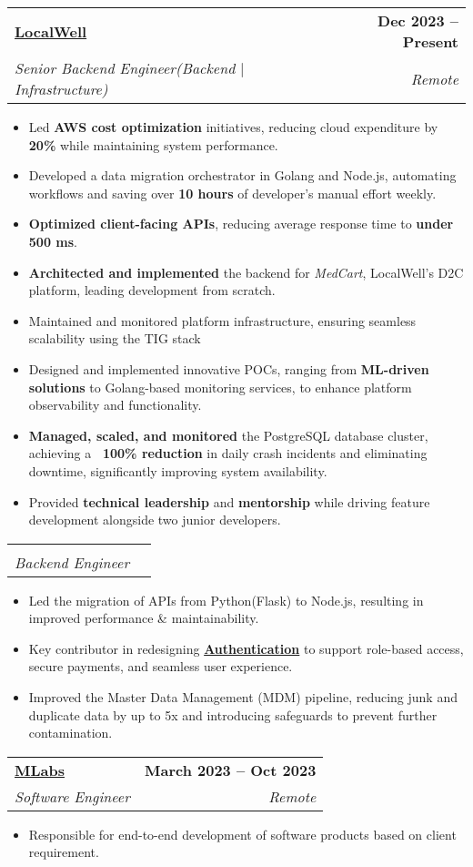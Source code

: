 \documentclass[letterpaper,11pt]{article}
\makeatletter
\newcommand{\resumeItem}[1]{
  \item\small{
    {#1 \vspace{-2pt}}
  }
}
\newcommand{\resumeSubheading}[4]{
  \vspace{-2pt}\item
    \begin{tabular*}{1.0\textwidth}[t]{l@{\extracolsep{\fill}}r}
      \textbf{#1} & \textbf{\small #2} \\
      \textit{\small#3} & \textit{\small #4} \\
    \end{tabular*}\vspace{-7pt}
}
\newcommand{\resumeItemListStart}{\begin{itemize}}
\newcommand{\resumeItemListEnd}{\end{itemize}\vspace{-5pt}}
\makeatother
\begin{document}
\resumeSubheading
  {\href{https://localwell.in/}{LocalWell}}{Dec 2023 -- Present}
  {Senior Backend Engineer(Backend $|$ Infrastructure)}{Remote}
  \resumeItemListStart
    \resumeItem{Led \textbf{AWS cost optimization} initiatives, reducing cloud expenditure by \textbf{20\%} while maintaining system performance.}
    \resumeItem{Developed a data migration orchestrator in Golang and Node.js, automating workflows and saving over\textbf{ 10 hours} of developer's manual effort weekly.}
    \resumeItem{\textbf{Optimized client-facing APIs}, reducing average response time to \textbf{under 500 ms}.}
    \resumeItem{\textbf{Architected and implemented} the backend for \textit{MedCart}, LocalWell’s D2C platform, leading development from scratch.}
        \resumeItem{Maintained and monitored platform infrastructure, ensuring seamless scalability using the TIG stack}
            \resumeItem{Designed and implemented innovative POCs, ranging from\textbf{ ML-driven solutions} to Golang-based monitoring services, to enhance platform observability and functionality.}
    \resumeItem{\textbf{Managed, scaled, and monitored} the PostgreSQL database cluster, achieving a \textbf{~100\% reduction} in daily crash incidents and eliminating downtime, significantly improving system availability.}
    \resumeItem{Provided \textbf{technical leadership} and \textbf{mentorship} while driving feature development alongside two junior developers.}
  \resumeItemListEnd

\vspace{-6mm}

\resumeSubheading
  {}{}
  {Backend Engineer}{}
  \resumeItemListStart
    \resumeItem{Led the migration of APIs from Python(Flask) to Node.js, resulting in improved performance \& maintainability.}
    \resumeItem{Key contributor in redesigning \href{https://drive.google.com/file/d/1XRRsgECoCF8LZstPu3XAlMPaB-yeh-vm/view?usp=sharing}{\textbf{Authentication}} to support role-based access, secure payments, and seamless user experience.}
    \resumeItem{Improved the Master Data Management (MDM) pipeline, reducing junk and duplicate data by up to 5x and introducing safeguards to prevent further contamination.}
  \resumeItemListEnd


    
    \resumeSubheading
      {\href{}{MLabs}}{March 2023 -- Oct 2023}
      {Software Engineer}{Remote}
      \resumeItemListStart
        \resumeItem{Responsible for end-to-end development of software products based on client requirement.}
    \resumeItemListEnd
    
\end{document}
